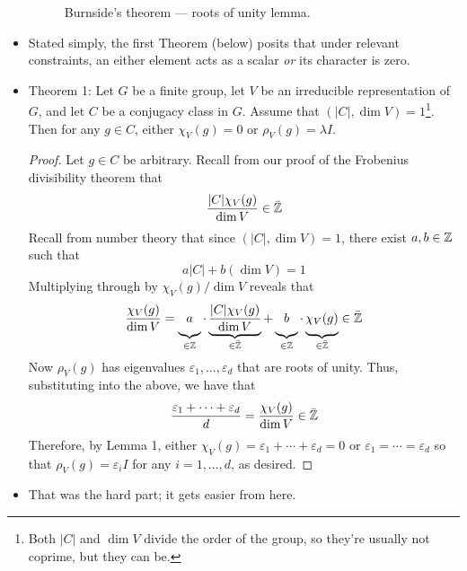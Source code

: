 \documentclass[../notes.tex]{subfiles}
\begin{document}
\begin{itemize}
\begin{figure}[h!]
        \caption{Burnside's theorem --- roots of unity lemma.}
        \label{fig:burnsideRootUniLemma}
    \end{figure}
    \item Stated simply, the first Theorem (below) posits that under relevant constraints, an either element acts as a scalar \emph{or} its character is zero.
    \item Theorem 1: Let $G$ be a finite group, let $V$ be an irreducible representation of $G$, and let $C$ be a conjugacy class in $G$. Assume that $(|C|,\dim V)=1$\footnote{Both $|C|$ and $\dim V$ divide the order of the group, so they're usually not coprime, but they can be.}. Then for any $g\in C$, either $\chi_V(g)=0$ or $\rho_V(g)=\lambda I$.
    \begin{proof}
        Let $g\in C$ be arbitrary. Recall from our proof of the Frobenius divisibility theorem that
        \begin{equation*}
            \frac{|C|\chi_V(g)}{\dim V} \in \bar{\mathbb{Z}}
        \end{equation*}
        Recall from number theory that since $(|C|,\dim V)=1$, there exist $a,b\in\mathbb{Z}$ such that
        \begin{equation*}
            a|C|+b(\dim V) = 1
        \end{equation*}
        Multiplying through by $\chi_V(g)/\dim V$ reveals that
        \begin{equation*}
            \frac{\chi_V(g)}{\dim V} = \underbrace{a\vphantom{\frac{|C|\chi_V(g)}{\dim V}}}_{\in\Z\vphantom{\bar{\Z}}}\cdot\underbrace{\frac{|C|\chi_V(g)}{\dim V}}_{\in\bar{\Z}}+\underbrace{b\vphantom{\frac{|C|\chi_V(g)}{\dim V}}}_{\in\Z\vphantom{\bar{\Z}}}\cdot\underbrace{\chi_V(g)\vphantom{\frac{|C|\chi_V(g)}{\dim V}}}_{\in\bar{\Z}} \in \bar{\Z}
        \end{equation*}
        Now $\rho_V(g)$ has eigenvalues $\varepsilon_1,\dots,\varepsilon_d$ that are roots of unity. Thus, substituting into the above, we have that
        \begin{equation*}
            \frac{\varepsilon_1+\cdots+\varepsilon_d}{d} = \frac{\chi_V(g)}{\dim V}
            \in \bar{\mathbb{Z}}
        \end{equation*}
        Therefore, by Lemma 1, either $\chi_V(g)=\varepsilon_1+\cdots+\varepsilon_d=0$ or $\varepsilon_1=\cdots=\varepsilon_d$ so that $\rho_V(g)=\varepsilon_iI$ for any $i=1,\dots,d$, as desired.
    \end{proof}
    \item That was the hard part; it gets easier from here.
        

\end{itemize}
\end{document}
